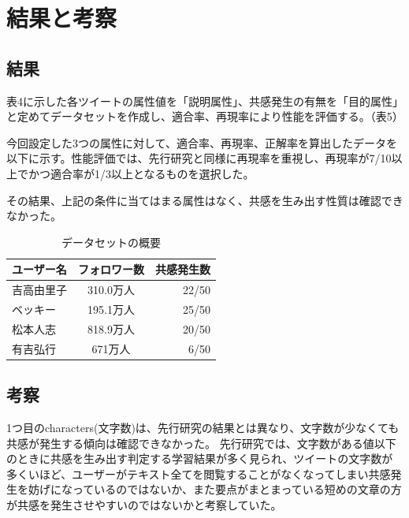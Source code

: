 \documentclass[dvipdfmx]{issj}
\begin{document}
\section{結果と考察}  %


\subsection{結果}  %
表4に示した各ツイートの属性値を「説明属性」、共感発生の有無を「目的属性」と定めてデータセットを作成し、適合率、再現率により性能を評価する。（表5）

今回設定した3つの属性に対して、適合率、再現率、正解率を算出したデータを以下に示す。性能評価では、先行研究と同様に再現率を重視し、再現率が7/10以上でかつ適合率が1/3以上となるものを選択した。

その結果、上記の条件に当てはまる属性はなく、共感を生み出す性質は確認できなかった。



\begin{table}[t]
  \caption{データセットの概要}
  \label{table:data_type}
  \centering
  \begin{tabular}{lcr}
    \hline
   ユーザー名 & フォロワー数  &  共感発生数  \\
    \hline \hline
吉高由里子 & 310.0万人 &  22/50  \\
ベッキー & 195.1万人 &  25/50  \\
松本人志 & 818.9万人 &  20/50  \\
有吉弘行 & 671万人 &  6/50 \\
    \hline
  \end{tabular}
\end{table}




\subsection{考察}  %
1つ目のcharacters(文字数)は、先行研究の結果とは異なり、文字数が少なくても共感が発生する傾向は確認できなかった。
先行研究では、文字数がある値以下のときに共感を生み出す判定する学習結果が多く見られ、ツイートの文字数が多くいほど、ユーザーがテキスト全てを閲覧することがなくなってしまい共感発生を妨げになっているのではないか、また要点がまとまっている短めの文章の方が共感を発生させやすいのではないかと考察していた。
\end{document}
